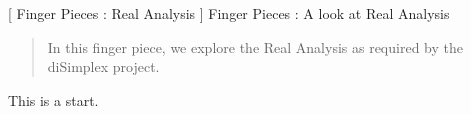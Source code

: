 
[
  Finger Pieces : Real Analysis
]{
  Finger Pieces : A look at Real Analysis
}
\author{Stephen Gaito}

\maketitle

\begin{abstract}
  In this finger piece, we explore the Real Analysis as required by the
  diSimplex project.
\end{abstract}

This is a start.
